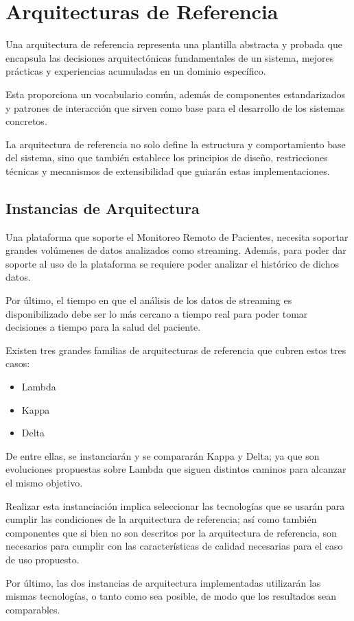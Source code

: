 \section{Arquitecturas de Referencia}

Una arquitectura de referencia representa una plantilla abstracta y probada que encapsula las decisiones arquitectónicas fundamentales de un sistema, 
mejores prácticas y experiencias acumuladas en un dominio específico. \newline

Esta proporciona un vocabulario común, además de componentes estandarizados y patrones de interacción que sirven como base para el desarrollo de los sistemas concretos. \newline

La arquitectura de referencia no solo define la estructura y comportamiento base del sistema, sino que también establece los principios de diseño, 
restricciones técnicas y mecanismos de extensibilidad que guiarán estas implementaciones.
\newpage

\subsection{Instancias de Arquitectura}

Una plataforma que soporte el Monitoreo Remoto de Pacientes, necesita soportar grandes volúmenes de datos analizados como streaming.
Además, para poder dar soporte al uso de la plataforma se requiere poder analizar el histórico de dichos datos. \newline

Por último, el tiempo en que el análisis de los datos de streaming es disponibilizado debe ser lo más cercano a tiempo real para poder tomar 
decisiones a tiempo para la salud del paciente. \newline

Existen tres grandes familias de arquitecturas de referencia que cubren estos tres casos: 
\begin{itemize}
    \item Lambda
    \item Kappa
    \item Delta
\end{itemize}

De entre ellas, se instanciarán y se compararán Kappa y Delta; ya que son evoluciones propuestas sobre Lambda que siguen distintos caminos para alcanzar el mismo objetivo. \newline
 
Realizar esta instanciación implica seleccionar las tecnologías que se usarán para cumplir las condiciones de la arquitectura de referencia; 
así como también componentes que si bien no son descritos por la arquitectura de referencia, son necesarios para cumplir con las características de calidad
necesarias para el caso de uso propuesto.\newline

Por último, las dos instancias de arquitectura implementadas utilizarán las mismas tecnologías, o tanto como sea posible, de modo que los resultados sean comparables.  
\newpage